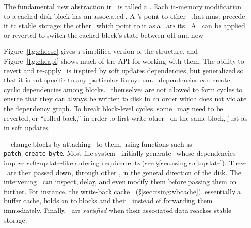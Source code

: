 The fundamental new abstraction in \Kudos\ is called a \chdesc. Each in-memory
modification to a cached disk block has an associated \chdesc. A \chdesc's
\emph{\befores} point to other \chdescs\ that must precede it to stable storage;
the other \chdescs\ which point to it as a \before\ are its \emph{\afters}. A
\chdesc\ can be applied or reverted to switch the cached block's state between
old and new.

Figure~\ref{fig:chdesc} gives a simplified version of the structure, and
Figure~\ref{fig:chdapi} shows much of the API for working with them. The ability
to revert and re-apply \chdescs\ is inspired by soft updates dependencies, but
generalized so that it is not specific to any particular file system. \Chdesc\
dependencies can create cyclic dependencies among blocks. \Chdescs\ themselves
are not allowed to form cycles to ensure that they can always be written to disk
in an order which does not violate the dependency graph. To break block-level
cycles, some \chdescs\ may need to be reverted, or ``rolled back,'' in order to
first write other \chdescs\ on the same block, just as in soft updates.

\Kudos\ \modules\ change blocks by attaching \chdescs\ to them, using functions
such as \texttt{patch\_create\_byte}. Most file system \modules\ initially
generate \chdescs\ whose dependencies impose soft-update-like ordering
requirements (see \S\ref{sec:using:softupdate}). These \chdescs\ are then passed
down, through other \modules, in the general direction of the disk. The
intervening \modules\ can inspect, delay, and even modify them before passing
them on further. For instance, the write-back cache \module\
(\S\ref{sec:using:wbcache}), essentially a buffer cache, holds on to blocks and
their \chdescs\ instead of forwarding them immediately. Finally, \chdescs\ are
\emph{satisfied} when their associated data reaches stable storage.





